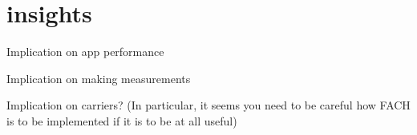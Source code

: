 \section{insights}

Implication on app performance

Implication on making measurements

Implication on carriers? (In particular, it seems you need to be careful how FACH is to be implemented if it is to be at all useful)





